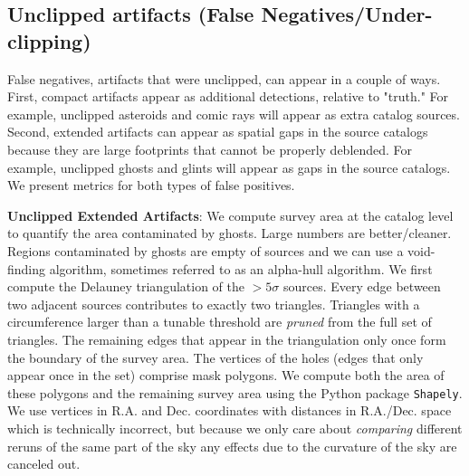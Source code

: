 \documentclass[DM,authoryear,toc]{lsstdoc}
\begin{document}
\subsection{Unclipped artifacts (False Negatives/Under-clipping)}

False negatives, artifacts that were unclipped, can appear in a couple of ways.
First, compact artifacts appear as additional detections, relative to "truth."
For example, unclipped asteroids and comic rays will appear as extra catalog sources.
Second, extended artifacts can appear as spatial gaps in the source catalogs because they are large footprints that cannot be properly deblended.
For example, unclipped ghosts and glints will appear as gaps in the source catalogs.
We present metrics for both types of false positives.

\textbf{Unclipped Extended Artifacts}:
We compute survey area at the catalog level to quantify the area contaminated by ghosts.
Large numbers are better/cleaner.
Regions contaminated by ghosts are empty of sources and we can use a void-finding algorithm,  sometimes referred to as an alpha-hull algorithm.
We first compute the Delauney triangulation of the  $> 5\sigma$ sources.
Every edge between two adjacent sources contributes to exactly two triangles.
Triangles with a circumference larger than a tunable threshold are \emph{pruned} from the full set of triangles.
The remaining edges that appear in the triangulation only once form the boundary of the  survey area.
The vertices of the holes (edges that only appear once in the set) comprise mask polygons.
We compute both the area of these polygons and the remaining survey area using the Python package \texttt{Shapely}.
We use vertices in R.A. and Dec. coordinates with distances in R.A./Dec. space which is technically incorrect, but because we only care about \emph{comparing} different reruns of the same part of the sky any effects due to the curvature of the sky are canceled out.

\end{document}
